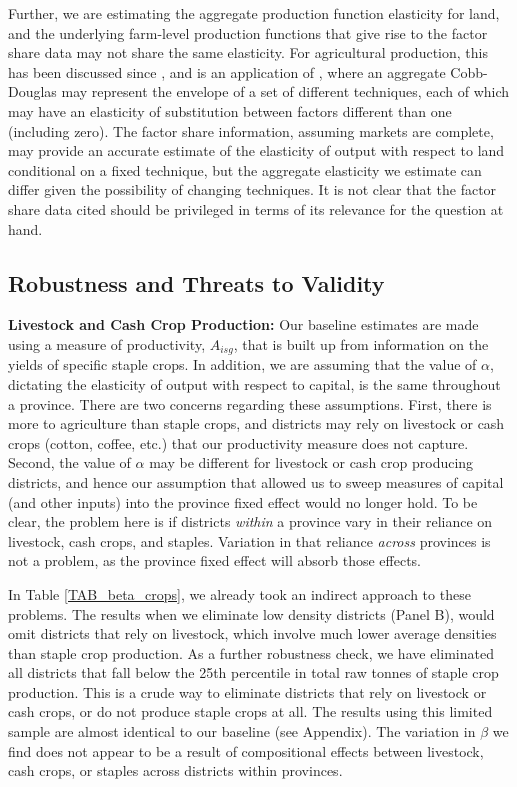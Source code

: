 \documentclass[11pt]{article}
\begin{document}
Further, we are estimating the aggregate production function elasticity for land, and the underlying farm-level production functions that give rise to the factor share data may not share the same elasticity. For agricultural production, this has been discussed since \citet{Hayami:1970ly}, and is an application of \citet{houthakker1955}, where an aggregate Cobb-Douglas may represent the envelope of a set of different techniques, each of which may have an elasticity of substitution between factors different than one (including zero). The factor share information, assuming markets are complete, may provide an accurate estimate of the elasticity of output with respect to land conditional on a fixed technique, but the aggregate elasticity we estimate can differ given the possibility of changing techniques. It is not clear that the factor share data cited should be privileged in terms of its relevance for the question at hand.

\subsection{Robustness and Threats to Validity}
\textbf{Livestock and Cash Crop Production:} Our baseline estimates are made using a measure of productivity, $A_{isg}$, that is built up from information on the yields of specific staple crops. In addition, we are assuming that the value of $\alpha$, dictating the elasticity of output with respect to capital, is the same throughout a province. There are two concerns regarding these assumptions. First, there is more to agriculture than staple crops, and districts may rely on livestock or cash crops (cotton, coffee, etc.) that our productivity measure does not capture. Second, the value of $\alpha$ may be different for livestock or cash crop producing districts, and hence our assumption that allowed us to sweep measures of capital (and other inputs) into the province fixed effect would no longer hold. To be clear, the problem here is if districts \textit{within} a province vary in their reliance on livestock, cash crops, and staples. Variation in that reliance \textit{across} provinces is not a problem, as the province fixed effect will absorb those effects.

In Table \ref{TAB_beta_crops}, we already took an indirect approach to these problems. The results when we eliminate low density districts (Panel B), would omit districts that rely on livestock, which involve much lower average densities than staple crop production. As a further robustness check, we have eliminated all districts that fall below the 25th percentile in total raw tonnes of staple crop production. This is a crude way to eliminate districts that rely on livestock or cash crops, or do not produce staple crops at all. The results using this limited sample are almost identical to our baseline (see Appendix). The variation in $\beta$ we find does not appear to be a result of compositional effects between livestock, cash crops, or staples across districts within provinces.
\end{document}
